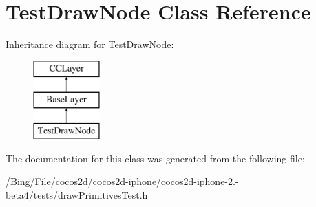 \hypertarget{interface_test_draw_node}{\section{Test\-Draw\-Node Class Reference}
\label{interface_test_draw_node}
}
Inheritance diagram for Test\-Draw\-Node\-:\begin{figure}[H]
\begin{center}
\leavevmode
\includegraphics[height=3.000000cm]{interface_test_draw_node}
\end{center}
\end{figure}


The documentation for this class was generated from the following file\-:\begin{DoxyCompactItemize}
\item 
/\-Bing/\-File/cocos2d/cocos2d-\/iphone/cocos2d-\/iphone-\/2.-\/beta4/tests/draw\-Primitives\-Test.\-h\end{DoxyCompactItemize}
